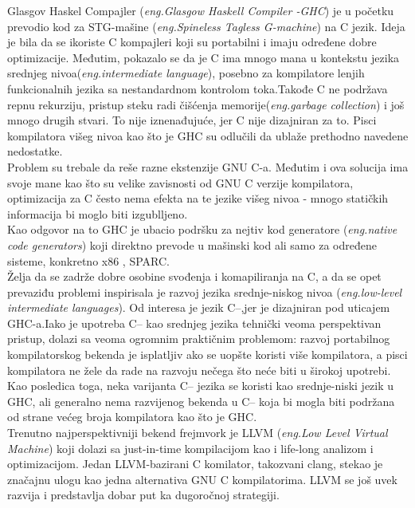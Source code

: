 Glasgov Haskel Compajler (\emph {eng.Glasgow Haskell Compiler -GHC}) je u početku prevodio kod za STG-mašine (\emph{eng.Spineless Tagless G-machine}) na C jezik. Ideja je bila da se ikoriste C kompajleri koji su portabilni i imaju određene dobre optimizacije. Međutim, pokazalo se da je C ima mnogo mana u kontekstu jezika srednjeg nivoa(\emph {eng.intermediate language}), posebno za kompilatore lenjih funkcionalnih jezika sa nestandardnom kontrolom toka.Takođe C ne podržava repnu rekurziju, pristup steku radi čišćenja memorije(\emph{eng.garbage collection}) i još mnogo drugih stvari. To nije iznenađujuće, jer C nije dizajniran za to. Pisci kompilatora višeg nivoa kao što je GHC su odlučili da ublaže prethodno navedene nedostatke.\\

 \indent Problem su trebale da reše razne ekstenzije GNU C-a. Međutim i ova solucija ima svoje mane kao što su velike zavisnosti od GNU C verzije kompilatora, optimizacija za C često nema efekta na te jezike višeg nivoa - mnogo statičkih informacija bi moglo biti izgublljeno. \\
 
 \indent Kao odgovor na to GHC je ubacio podršku za nejtiv kod generatore (\emph{eng.native code generators}) koji direktno prevode u mašinski kod ali samo za određene sisteme, konkretno x86 , SPARC.\\
 
 \indent Želja da se zadrže dobre osobine svođenja i komapiliranja na C, a da se opet prevaziđu problemi inspirisala je razvoj jezika srednje-niskog nivoa (\emph{eng.low-level intermediate languages}). Od interesa je jezik C--,jer je dizajniran pod uticajem GHC-a.Iako je upotreba C-- kao srednjeg jezika tehnički veoma perspektivan pristup, dolazi sa veoma ogromnim praktičnim problemom: razvoj portabilnog kompilatorskog bekenda je isplatljiv ako se uopšte koristi više kompilatora, a pisci kompilatora ne žele da rade na razvoju nečega što neće biti u širokoj upotrebi. Kao posledica toga, neka varijanta C-- jezika se koristi kao srednje-niski jezik u GHC, ali generalno nema razvijenog bekenda u C-- koja bi mogla biti podržana od strane većeg broja kompilatora kao što je GHC.\\
 
 \indent Trenutno najperspektivniji bekend frejmvork je LLVM (\emph{eng.Low Level Virtual Machine}) koji dolazi sa just-in-time kompilacijom kao i life-long analizom i optimizacijom. Jedan LLVM-bazirani C komilator, takozvani clang, stekao je značajnu ulogu kao jedna alternativa GNU C kompilatorima. LLVM se još uvek razvija i predstavlja dobar put ka dugoročnoj strategiji.

